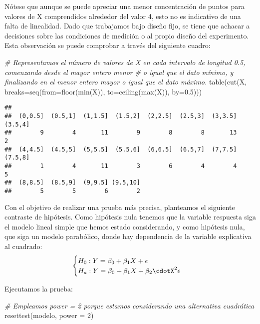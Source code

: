 \documentclass[
]{article}
\newenvironment{Shaded}{\begin{snugshade}}{\end{snugshade}}
\newcommand{\AttributeTok}[1]{\textcolor[rgb]{0.77,0.63,0.00}{#1}}
\newcommand{\CommentTok}[1]{\textcolor[rgb]{0.56,0.35,0.01}{\textit{#1}}}
\newcommand{\DecValTok}[1]{\textcolor[rgb]{0.00,0.00,0.81}{#1}}
\newcommand{\FloatTok}[1]{\textcolor[rgb]{0.00,0.00,0.81}{#1}}
\newcommand{\FunctionTok}[1]{\textcolor[rgb]{0.00,0.00,0.00}{#1}}
\newcommand{\NormalTok}[1]{#1}
\begin{document}
Nótese que aunque se puede apreciar una menor concentración de puntos
para valores de X comprendidos alrededor del valor 4, esto no es
indicativo de una falta de linealidad. Dado que trabajamos bajo diseño
fijo, se tiene que achacar a decisiones sobre las condiciones de
medición o al propio diseño del experimento. Esta observación se puede
comprobar a través del siguiente cuadro:

\begin{Shaded}
\begin{Highlighting}[]
\CommentTok{\# Representamos el número de valores de X en cada intervalo de longitud 0.5, comenzando desde el mayor entero menor}
\CommentTok{\# o igual que el dato mínimo, y finalizando en el menor entero mayor o igual que el dato máximo.}
\FunctionTok{table}\NormalTok{(}\FunctionTok{cut}\NormalTok{(X, }\AttributeTok{breaks=}\FunctionTok{seq}\NormalTok{(}\AttributeTok{from=}\FunctionTok{floor}\NormalTok{(}\FunctionTok{min}\NormalTok{(X)), }\AttributeTok{to=}\FunctionTok{ceiling}\NormalTok{(}\FunctionTok{max}\NormalTok{(X)), }\AttributeTok{by=}\FloatTok{0.5}\NormalTok{)))}
\end{Highlighting}
\end{Shaded}

\begin{verbatim}
## 
##  (0,0.5]  (0.5,1]  (1,1.5]  (1.5,2]  (2,2.5]  (2.5,3]  (3,3.5]  (3.5,4] 
##        9        4       11        9        8        8       13        2 
##  (4,4.5]  (4.5,5]  (5,5.5]  (5.5,6]  (6,6.5]  (6.5,7]  (7,7.5]  (7.5,8] 
##        1        4       11        3        6        4        4        5 
##  (8,8.5]  (8.5,9]  (9,9.5] (9.5,10] 
##        5        5        6        2
\end{verbatim}

Con el objetivo de realizar una prueba más precisa, planteamos el
siguiente contraste de hipótesis. Como hipótesis nula tenemos que la
variable respuesta siga el modelo lineal simple que hemos estado
considerando, y como hipótesis nula, que siga un modelo parabólico,
donde hay dependencia de la variable explicativa al cuadrado: \[
\begin{cases}
H_0: Y=\beta_0+\beta_1X+\epsilon\\
H_a: Y=\beta_0+\beta_1X+\beta_2\cdotX^2\epsilon
\end{cases}
\]

Ejecutamos la prueba:

\begin{Shaded}
\begin{Highlighting}[]
\CommentTok{\# Empleamos power = 2 porque estamos considerando una alternativa cuadrática}
\FunctionTok{resettest}\NormalTok{(modelo, }\AttributeTok{power =} \DecValTok{2}\NormalTok{)}
\end{Highlighting}
\end{Shaded}
\end{document}
